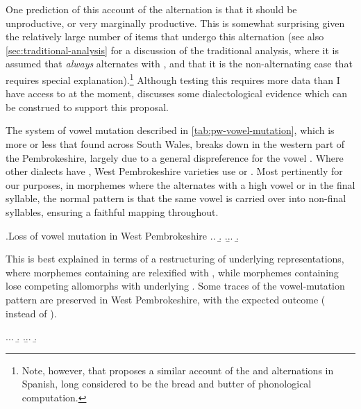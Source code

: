 One prediction of this account of the \alternation{[u]}{[ə]} alternation is that it should be unproductive, or very marginally productive. This is somewhat surprising given the relatively large number of items that undergo this alternation (see also \cref{sec:traditional-analysis} for a discussion of the traditional analysis, where it is assumed that \ipa{[u]} \emph{always} alternates with \ipa{[ə]}, and that it is the non\hyp alternating case that requires special explanation).\footnote{Note, however, that \citet{bermúdez-oterong:_spanis} proposes a similar account of the  and  alternations in Spanish, long considered to be the bread and butter of phonological computation.} Although testing this requires more data than I have access to at the moment, \citet{awbery86:_pembr_welsh} discusses some dialectological evidence which can be construed to support this proposal.

The system of vowel mutation described in \cref{tab:pw-vowel-mutation}, which is more or less that found across South Wales, breaks down in the western part of the Pembrokeshire, largely due to a general dispreference for the vowel \ipa{[ə]}. Where other dialects have \ipa{[ə]}, West Pembrokeshire varieties use \ipa{[i]} or \ipa{[u]}. Most pertinently for our purposes, in morphemes where the \ipa{[ə]} alternates with a high vowel \ipa{[i]} or \ipa{[u]} in the final syllable, the normal pattern is that the same vowel is carried over into non-final syllables, ensuring a faithful mapping throughout.

\ex.Loss of vowel mutation in West Pembrokeshire
\a.\a.
\b.
\z.\b.\a.
\b.

This is best explained in terms of a restructuring of underlying representations, where morphemes containing \ipa{[ə]} are relexified with \ipa{[i]}, while morphemes containing \ipa{[u]} lose competing allomorphs with underlying \ipa{[ə]}. Some traces of the vowel\hyp mutation pattern are preserved in West Pembrokeshire, with the expected outcome (\ipa{[i]} instead of \ipa{[ə]}).

\ex.\a.\a.
\b.
\z.\b.\a.
\b.

